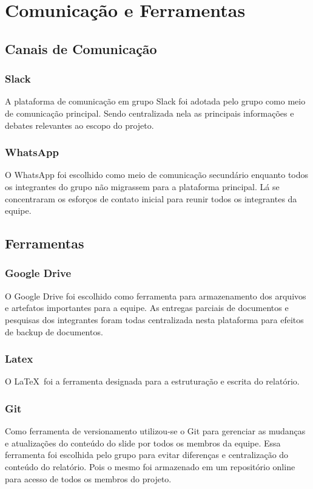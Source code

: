 \chapter[Comunicação e Ferramentas]{Comunicação e Ferramentas}

\section{Canais de Comunicação}

\subsection{Slack}
A plataforma de comunicação em grupo Slack foi adotada pelo grupo como meio de comunicação principal.
Sendo centralizada nela as principais informações e debates relevantes ao escopo do projeto.

\subsection{WhatsApp}
O WhatsApp foi escolhido como meio de comunicação secundário enquanto todos os integrantes do grupo
não migrassem para a plataforma principal. Lá se concentraram os esforços de contato inicial para reunir
todos os integrantes da equipe.

\section{Ferramentas}

\subsection{Google Drive}
O Google Drive foi escolhido como ferramenta para armazenamento dos arquivos e artefatos importantes para a
equipe. As entregas parciais de documentos e pesquisas dos integrantes foram todas centralizada nesta plataforma
para efeitos de backup de documentos.

\subsection{Latex}
O \LaTeX\ foi a ferramenta designada para a estruturação e escrita do relatório.

\subsection{Git}
Como ferramenta de versionamento utilizou-se o Git para gerenciar as mudanças e atualizações do conteúdo do slide
por todos os membros da equipe. Essa ferramenta foi escolhida pelo grupo para evitar diferenças e centralização do
conteúdo do relatório. Pois o mesmo foi armazenado em um repositório online para acesso de todos os membros do projeto.
